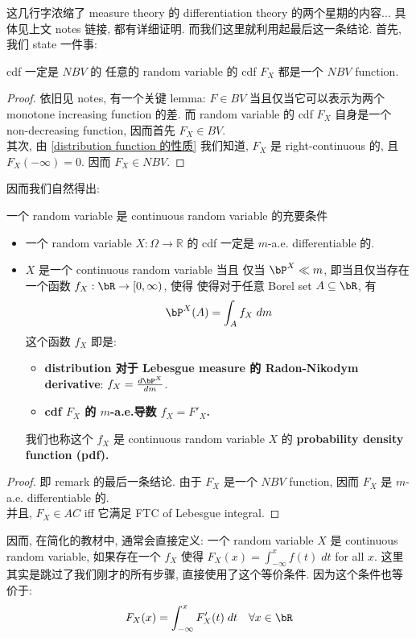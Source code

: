 这几行字浓缩了 measure theory 的 differentiation theory 的两个星期的内容...
具体见上文 notes 链接, 都有详细证明.
而我们这里就利用起最后这一条结论. 首先, 我们 state 一件事:
\begin{lemma}{cdf 一定是 \(NBV\) 的} \label{cdf 一定是 NBV 的}
    任意的 random variable 的 cdf \(F_X\) 都是一个 \(NBV\) function.
\end{lemma}
\begin{proof}
    依旧见 notes, 有一个关键 lemma: \(F \in BV\) 当且仅当它可以表示为两个 
    monotone increasing function 的差. 
    而 random variable 的 cdf \(F_X\) 自身是一个 non-decreasing function, 因而首先 \(F_X \in BV\).\\
    其次, 由 \ref{distribution function 的性质} 我们知道, 
    \(F_X\) 是 right-continuous 的, 
    且 \(F_X(-\infty) = 0\). 因而 \(F_X \in NBV\).
\end{proof}
因而我们自然得出:
\begin{theorem}{一个 random variable 是 continuous random variable 的充要条件}
\begin{itemize}
    \item 一个 random variable \(X: \Omega \to \mathbb{R}\) 的 cdf 一定是 \(m\)-a.e.
     differentiable 的.
    \item  \(X\) 是一个 continuous random variable 当且
    仅当 \(\bP^X \ll m\), 即当且仅当存在一个函数 \(f_X: \bR \to [0,\infty)\), 使得 
    使得对于任意 Borel set \(A \subseteq \bR\), 有 \[\bP^X(A) = \int_A f_X \;dm\]
    这个函数 \(f_X\) 即是:
    \begin{itemize}
        \item \textbf{distribution 对于 Lebesgue measure 的 Radon-Nikodym derivative}:  \(f_X = \frac{d\bP^X}{dm}\). 
        \item \textbf{cdf \(F_X\) 的 \(m\)-a.e.导数 \(f_X = F'_X\).}
    \end{itemize}
    我们也称这个 \(f_X\) 是
    continuous random variable \(X\) 的 \textbf{probability density function (pdf).}
\end{itemize}
\end{theorem}
\begin{proof}
    即 remark 的最后一条结论. 由于 \(F_X\) 是一个 \(NBV\) function, 
    因而 \(F_X\) 是 \(m\)-a.e. differentiable 的.\\
    并且, \(F_X \in AC\) iff 它满足 FTC of Lebesgue integral.
\end{proof}
\begin{remark}
因而, 在简化的教材中, 通常会直接定义: 一个 random variable \(X\) 
是 continuous random variable, 
如果存在一个 \(f_X\) 使得 \(F_X(x) = \int_{-\infty}^x f(t)\;dt\) for all \(x\).
 这里其实是跳过了我们刚才的所有步骤, 直接使用了这个等价条件. 因为这个条件也等价于:
     \[
    F_X(x) = \int_{-\infty}^x F'_X(t) \;dt \quad \forall x \in \bR
    \]
\end{remark}

